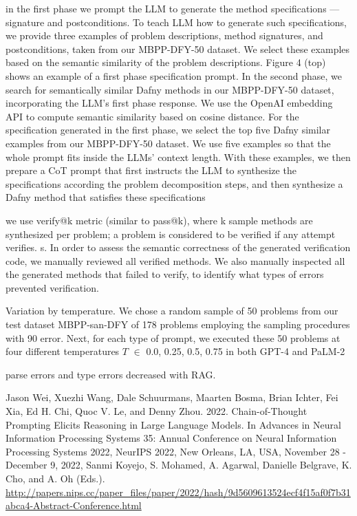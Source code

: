 \documentclass[12pt,letterpaper]{article}
\begin{document}
in the first phase we prompt the LLM to generate the method specifications
---signature and postconditions. To teach LLM how to generate such specifications,
we provide three examples of problem descriptions, method signatures, and
postconditions, taken from our MBPP-DFY-50 dataset. We select these examples
based on the semantic similarity of the problem descriptions. Figure 4 (top)
shows an example of a first phase specification prompt. In the second phase, we
search for semantically similar Dafny methods in our MBPP-DFY-50 dataset,
incorporating the LLM's first phase response. We use the OpenAI embedding API to
compute semantic similarity based on cosine distance. For the specification
generated in the first phase, we select the top five Dafny similar examples from
our MBPP-DFY-50 dataset. We use five examples so that the whole prompt fits
inside the LLMs' context length. With these examples, we then prepare a CoT
prompt that first instructs the LLM to synthesize the specifications according
the problem decomposition steps, and then synthesize a Dafny method that
satisfies these specifications

we use verify@k metric (similar to pass@k), where k sample methods are synthesized
per problem; a problem is considered to be verified if any attempt verifies. s. In order to assess the semantic correctness of the generated verification
code, we manually reviewed all verified methods. We also manually inspected all the generated
methods that failed to verify, to identify what types of errors prevented verification.

Variation by temperature. We chose a random sample of 50 problems from our test dataset MBPP-san-DFY of
178 problems employing the sampling procedures with 90%
error. Next, for each type of prompt, we executed these 50 problems at four
different temperatures $T$ $\in$ {0.0, 0.25, 0.5, 0.75} in both GPT-4 and PaLM-2

parse errors and type errors decreased with RAG.

Jason Wei, Xuezhi Wang, Dale Schuurmans, Maarten Bosma, Brian Ichter, Fei Xia, Ed H. Chi, Quoc V. Le, and Denny Zhou.
2022. Chain-of-Thought Prompting Elicits Reasoning in Large Language Models. In Advances in Neural Information
Processing Systems 35: Annual Conference on Neural Information Processing Systems 2022, NeurIPS 2022, New Orleans, LA,
USA, November 28 - December 9, 2022, Sanmi Koyejo, S. Mohamed, A. Agarwal, Danielle Belgrave, K. Cho, and A. Oh
(Eds.). \url{http://papers.nips.cc/paper_files/paper/2022/hash/9d5609613524ecf4f15af0f7b31abca4-Abstract-Conference.html}
\end{document}
